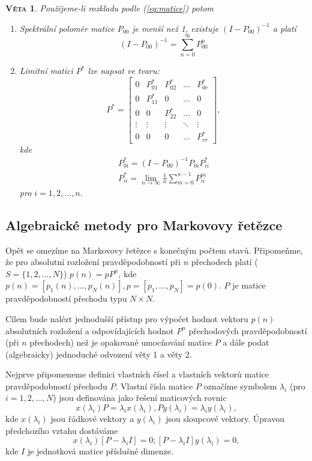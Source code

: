 \documentclass[10pt]{article}
\newtheorem{proposition}{\textsc{Věta}}
\begin{document}
\begin{proposition}
Použijeme-li rozkladu podle (\ref{eq:matice}) potom
\begin{enumerate}
\item Spektrální poloměr matice $P_{00}$ je menší než 1, existuje $(I-P_{00})^{-1}$ a platí $$(I-P_{00})^{-1} = \sum_{n=0}^{\infty} P_{00}^n$$
\item Limitní matici $P^*$ lze napsat ve tvaru: 
\begin{equation*}
\label{eq:rozklad1}
 P^* = \begin{bmatrix}
0 & P_{01}^* & P_{02}^*&... & P_{0r}^*\\
0& P_{11}^*&0&...&0\\
0& 0& P_{22}^*&...&0\\
\vdots & \vdots & \vdots & \ddots & \vdots \\
0 & 0 & 0 & ... & P_{rr}^*
\end{bmatrix},\end{equation*} kde \begin{gather*}
P_{0i}^* = (I-P_{00})^{-1} P_{0i} P_{ii}^*\\
P_{ii}^* = \lim_{n \to \infty} \frac{1}{n} \sum_{m=0}^{n-1} P_{ii}^m
\end{gather*}pro $i=1,2,...,n.$
\end{enumerate}
\end{proposition}

\subsection{Algebraické metody pro Markovovy řetězce}
\label{sec:2.5}
Opět se omezíme na Markovovy řetězce s konečným počtem stavů. Připomeňme, že pro absolutní rozložení pravděpodobností při $n$ přechodech platí ($S=\{1,2,...,N\}$) $p(n) = p P^n$, kde $p(n) = [p_1(n),...,p_N(n)], p = [p_1,...,p_N] = p(0).$ $P$ je matice pravděpodobností přechodu typu $N \times N$.

Cílem bude nalézt jednodušší přístup pro výpočet hodnot vektoru $p(n)$ absolutních rozložení a odpovídajících hodnot $P^n$ přechodových pravděpodobností (při $n$ přechodech) než je opakované umocňování matice $P$ a dále podat (algebraicky) jednoduché odvození věty 1 a věty 2.

Nejprve připomeneme definici vlastních čísel a vlastních vektorů matice pravděpodobností přechodu $P$. Vlastní čísla matice $P$ označíme symbolem $\lambda_i$ (pro $i=1,2,...,N$) jsou definována jako řešení maticových rovnic
\begin{equation}
x(\lambda_i) P = \lambda_i x(\lambda_i), Py(\lambda_i) = \lambda_i y(\lambda_i),
\end{equation}
kde $x(\lambda_i)$ jsou řádkové vektory a $y(\lambda_i)$ jsou sloupcové vektory. Úpravou předchozího vztahu dostáváme $$x(\lambda_i)[P-\lambda_i I] = 0; [P-\lambda_i I]y(\lambda_i)=0,$$kde $I$ je jednotková matice příslušné dimenze.
\end{document}
